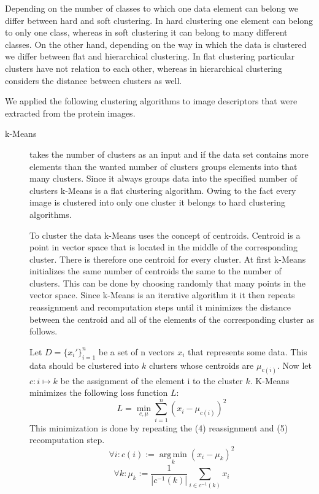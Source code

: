 \documentclass[journal]{vgtc}       %
\begin{document}
Depending on the number of classes to which one data element can belong we differ between hard and soft clustering. In hard clustering one element can belong to only one class, whereas in soft clustering it can belong to many different classes. 
On the other hand, depending on the way in which the data is clustered we differ between flat and hierarchical clustering. In flat clustering particular clusters have not relation to each other, whereas in hierarchical clustering considers the distance between clusters as well.

We applied the following clustering algorithms to image descriptors that were extracted from the protein images.

\begin{description}
\item [k-Means] takes the number of clusters as an input and if the data set contains more elements than the wanted number of clusters groups elements into that many clusters. Since it always groups data into the specified number of clusters k-Means is a flat clustering algorithm. Owing to the fact every image is clustered into only one cluster it belongs to hard clustering algorithms. 

To cluster the data k-Means uses the concept of centroids. Centroid is a point in vector space that is located in the middle of the corresponding cluster. There is therefore one centroid for every cluster. 
At first k-Means initializes the same number of centroids the same to the number of clusters. This can be done by choosing randomly that many points in the vector space. Since k-Means is an iterative algorithm it  it then repeats reassignment and recomputation steps until it minimizes the distance between the centroid and all of the elements of the corresponding cluster as follows. 

Let $D = \{x_i'\}_{i=1}^n$ be a set of n vectors $x_i$ that represents some data. This data should be clustered into $k$ clusters whose centroids are  $\mu_{c(i)}$. Now let $c: i \mapsto k$ be the assignment of the element i to the cluster $k$. 
K-Means minimizes the following loss function $L$:
\begin{equation}
L = \min_{c, \mu} \sum_{i=1}^{n}(x_i - \mu_{c(i)})^2
\end{equation} 
This minimization is done by repeating the (4) reassignment and (5) recomputation step.
\begin{equation}
\forall i: c(i) := \operatorname*{arg\,min}_k (x_i - \mu_k)^2
\end{equation}
\begin{equation}
\forall k: \mu_k := \frac{1}{|c^{-1}(k)|} \sum_{i \in c^{-1}(k)} x_i
\end{equation}



\end{description}
\end{document}
